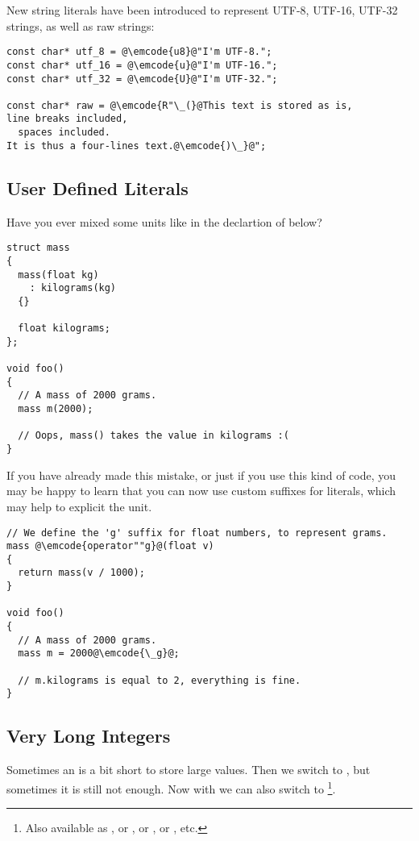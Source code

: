 New string literals have been introduced to represent UTF-8, UTF-16,
UTF-32 strings, as well as raw strings:

\begin{lstlisting}
const char* utf_8 = @\emcode{u8}@"I'm UTF-8.";
const char* utf_16 = @\emcode{u}@"I'm UTF-16.";
const char* utf_32 = @\emcode{U}@"I'm UTF-32.";

const char* raw = @\emcode{R"\_(}@This text is stored as is,
line breaks included,
  spaces included.
It is thus a four-lines text.@\emcode{)\_}@";
\end{lstlisting}

\subsection{User Defined Literals}

Have you ever mixed some units like in the declartion of  below?

\begin{lstlisting}
struct mass
{
  mass(float kg)
    : kilograms(kg)
  {}

  float kilograms;
};

void foo()
{
  // A mass of 2000 grams.
  mass m(2000);

  // Oops, mass() takes the value in kilograms :(
}
\end{lstlisting}

If you have already made this mistake, or just if you use this kind of
code, you may be happy to learn that you can now use custom suffixes
for literals, which may help to explicit the unit.

\begin{lstlisting}
// We define the 'g' suffix for float numbers, to represent grams.
mass @\emcode{operator""g}@(float v)
{
  return mass(v / 1000);
}

void foo()
{
  // A mass of 2000 grams.
  mass m = 2000@\emcode{\_g}@;

  // m.kilograms is equal to 2, everything is fine.
}
\end{lstlisting}

\subsection{Very Long Integers}

Sometimes an  is a bit short to store large values. Then we
switch to , but sometimes it is still not enough. Now
with  we can also switch to \footnote{Also
available as , or ,
or , or , etc.}.

